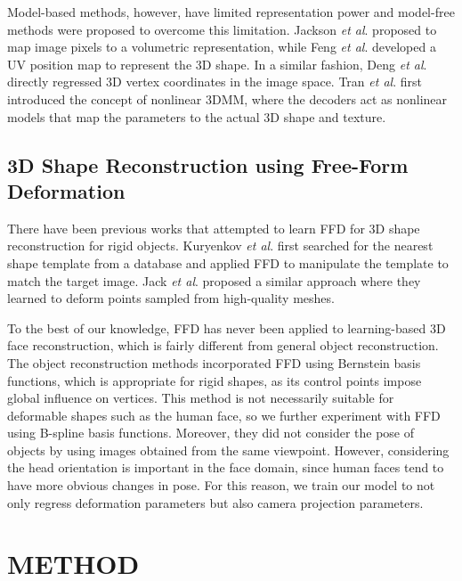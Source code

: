 \documentclass[letterpaper, 10 pt, conference]{ieeeconf}
\begin{document}
Model-based methods, however, have limited representation power and model-free methods \cite{jackson2017large, feng2018joint, deng2020retinaface} were proposed to overcome this limitation. Jackson \emph{et al}. \cite{jackson2017large} proposed to map image pixels to a volumetric representation, while Feng \emph{et al}. \cite{feng2018joint} developed a UV position map to represent the 3D shape. In a similar fashion, Deng \emph{et al}. \cite{deng2020retinaface} directly regressed 3D vertex coordinates in the image space.
Tran \emph{et al}. \cite{tran2018nonlinear} first introduced the concept of nonlinear 3DMM, where the decoders act as nonlinear models that map the parameters to the actual 3D shape and texture. 

\subsection{3D Shape Reconstruction using Free-Form Deformation}
There have been previous works that attempted to learn FFD for 3D shape reconstruction for rigid objects. Kuryenkov \emph{et al}. \cite{kurenkov2018deformnet} first searched for the nearest shape template from a database and applied FFD to manipulate the template to match the target image. Jack \emph{et al}. \cite{jack2018learning} proposed a similar approach where they learned to deform points sampled from high-quality meshes. 

To the best of our knowledge, FFD has never been applied to learning-based 3D face reconstruction, which is fairly different from general object reconstruction. The object reconstruction methods \cite{kurenkov2018deformnet, jack2018learning} incorporated FFD using Bernstein basis functions, which is appropriate for rigid shapes, as its control points impose global influence on vertices. This method is not necessarily suitable for deformable shapes such as the human face, so we further experiment with FFD using B-spline basis functions.
Moreover, they did not consider the pose of objects by using images obtained from the same viewpoint.
However, considering the head orientation is important in the face domain, since human faces tend to have more obvious changes in pose. For this reason, we train our model to not only regress deformation parameters but also camera projection parameters.


\section{METHOD}
\end{document}
